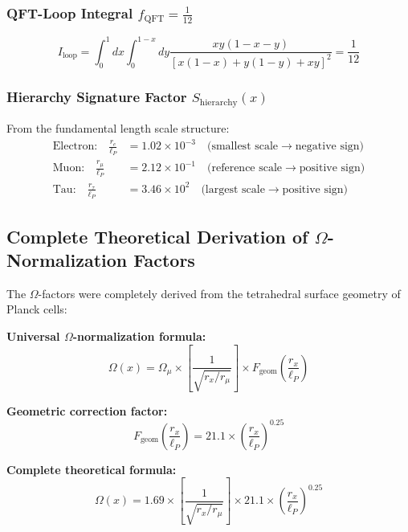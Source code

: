 \documentclass[12pt,a4paper]{article}
\numberwithin{equation}{section}
\newcommand{\fQFT}{f_{\text{QFT}}}
\newcommand{\lP}{\ell_P}
\newcommand{\Omegafactor}{\Omega}
\begin{document}
	\subsubsection{QFT-Loop Integral $\fQFT = \frac{1}{12}$}
	\begin{equation}
		I_{\text{loop}} = \int_0^1 dx \int_0^{1-x} dy \frac{xy(1-x-y)}{[x(1-x) + y(1-y) + xy]^2} = \frac{1}{12}
		\label{eq:loop_integral}
	\end{equation}
	
	\subsubsection{Hierarchy Signature Factor $S_{\text{hierarchy}}(x)$}
	
	From the fundamental length scale structure:
	\begin{align}
		\text{Electron:} \quad \frac{r_e}{\ell_P} &= 1.02 \times 10^{-3} \quad \text{(smallest scale} \rightarrow \text{negative sign)}\\
		\text{Muon:} \quad \frac{r_\mu}{\ell_P} &= 2.12 \times 10^{-1} \quad \text{(reference scale} \rightarrow \text{positive sign)}\\
		\text{Tau:} \quad \frac{r_\tau}{\ell_P} &= 3.46 \times 10^{2} \quad \text{(largest scale} \rightarrow \text{positive sign)}
		\label{eq:length_scales}
	\end{align}
	
	\subsection{Complete Theoretical Derivation of $\Omega$-Normalization Factors}
	
	The $\Omega$-factors were completely derived from the tetrahedral surface geometry of Planck cells:
	
	\textbf{Universal $\Omegafactor$-normalization formula:}
	\begin{equation}
		\Omegafactor(x) = \Omegafactor_\mu \times \left[\frac{1}{\sqrt{r_x/r_\mu}}\right] \times F_{\text{geom}}\left(\frac{r_x}{\lP}\right)
		\label{eq:omega_universal}
	\end{equation}
	
	\textbf{Geometric correction factor:}
	\begin{equation}
		F_{\text{geom}}\left(\frac{r_x}{\lP}\right) = 21.1 \times \left(\frac{r_x}{\lP}\right)^{0.25}
		\label{eq:f_geom}
	\end{equation}
	
	\textbf{Complete theoretical formula:}
	\begin{equation}
		\Omegafactor(x) = 1.69 \times \left[\frac{1}{\sqrt{r_x/r_\mu}}\right] \times 21.1 \times \left(\frac{r_x}{\lP}\right)^{0.25}
		\label{eq:omega_complete}
	\end{equation}
	
\end{document}
